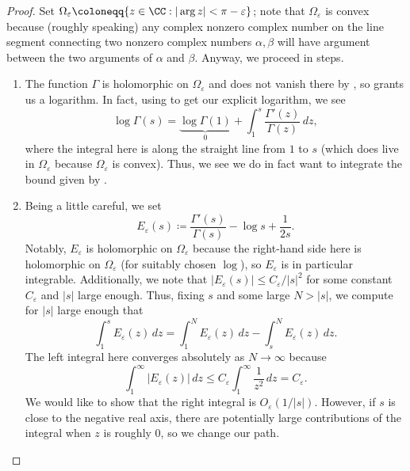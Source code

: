 \documentclass[../notes.tex]{subfiles}
\begin{document}
\begin{proof}
	Set $\Omega_\varepsilon\coloneqq\{z\in\CC:|\arg z|<\pi-\varepsilon\}$; note that $\Omega_\varepsilon$ is convex because (roughly speaking) any complex nonzero complex number on the line segment connecting two nonzero complex numbers $\alpha,\beta$ will have argument between the two arguments of $\alpha$ and $\beta$. Anyway, we proceed in steps.
	\begin{enumerate}
		\item The function $\Gamma$ is holomorphic on $\Omega_\varepsilon$ and does not vanish there by , so  grants us a logarithm. In fact, using  to get our explicit logarithm, we see
		\[\log\Gamma(s)=\underbrace{\log\Gamma(1)}_0+\int_1^s\frac{\Gamma'(z)}{\Gamma(z)}\,dz,\]
		where the integral here is along the straight line from $1$ to $s$ (which does live in $\Omega_\varepsilon$ because $\Omega_\varepsilon$ is convex). Thus, we see we do in fact want to integrate the bound given by .

		\item Being a little careful, we set
		\[E_\varepsilon(s)\coloneqq\frac{\Gamma'(s)}{\Gamma(s)}-\log s+\frac1{2s}.\]
		Notably, $E_\varepsilon$ is holomorphic on $\Omega_\varepsilon$ because the right-hand side here is holomorphic on $\Omega_\varepsilon$ (for suitably chosen $\log$), so $E_\varepsilon$ is in particular integrable. Additionally, we note that $|E_\varepsilon(s)|\le C_\varepsilon/|s|^2$ for some constant $C_\varepsilon$ and $|s|$ large enough. Thus, fixing $s$ and some large $N>|s|$, we compute for $|s|$ large enough that
		\[\int_1^sE_\varepsilon(z)\,dz = \int_1^NE_\varepsilon(z)\,dz-\int_s^NE_\varepsilon(z)\,dz.\]
		The left integral here converges absolutely as $N\to\infty$ because
		\[\int_1^\infty|E_\varepsilon(z)|\,dz\le C_\varepsilon\int_1^\infty\frac1{z^2}\,dz=C_\varepsilon.\]
		We would like to show that the right integral is $O_\varepsilon(1/|s|)$. However, if $s$ is close to the negative real axis, there are potentially large contributions of the integral when $z$ is roughly $0$, so we change our path.
		

\end{enumerate}
\end{proof}
\end{document}
